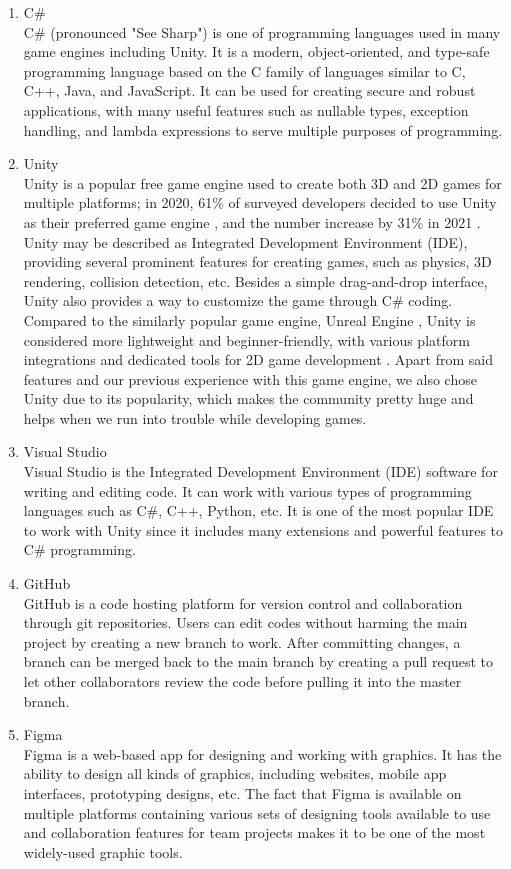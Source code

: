 \documentclass[12pt,oneside,openright,a4paper]{cpe-english-project}
\begin{document}
\begin{enumerate}
	\item C\# \\
	C\# (pronounced "See Sharp") is one of programming languages used in many game engines including Unity.  It is a modern, object-oriented, and type-safe programming language based on the C family of languages similar to C, C++, Java, and JavaScript. It can be used for creating secure and robust  applications, with many useful features such as nullable types, exception handling, and lambda expressions to serve multiple purposes of programming.
	\item Unity \\
	Unity is a popular free game engine used to create both 3D and 2D games for multiple platforms; in 2020, 61\% of surveyed developers decided to use Unity as their preferred game engine \cite{unity2021}, and the number increase by 31\% in 2021 \cite{unity2022}. Unity may be described as Integrated Development Environment (IDE), providing several prominent features for creating games, such as physics, 3D rendering, collision detection, etc. Besides a simple drag-and-drop interface, Unity also provides a way to customize the game through C\# coding. Compared to the similarly popular game engine, Unreal Engine \cite{perforce2022}, Unity is considered more lightweight and beginner-friendly, with various platform integrations and dedicated tools for 2D game development \cite{ben2022}. Apart from said features and our previous experience with this game engine, we also chose Unity due to its popularity, which makes the community pretty huge and helps when we run into trouble while developing games.
	\item Visual Studio \\
	Visual Studio is the Integrated Development Environment (IDE) software for writing and editing code. It can work with various types of programming languages such as C\#, C++, Python, etc. It is one of the most popular IDE to work with Unity since it includes many extensions and powerful features to C\# programming.
	\item GitHub \\
	GitHub is a code hosting platform for version control and collaboration through git repositories. Users can edit codes without harming the main project by creating a new branch to work. After committing changes, a branch can be merged back to the main branch by creating a pull request to let other collaborators review the code before pulling it into the master branch.
	\item Figma \\
	Figma is a web-based app for designing and working with graphics. It has the ability to design all kinds of graphics, including websites, mobile app interfaces, prototyping designs, etc. The fact that Figma is available on multiple platforms containing various sets of designing tools available to use and collaboration features for team projects \cite{daniel2022} makes it to be one of the most widely-used graphic tools.
\end{enumerate}
\end{document}
